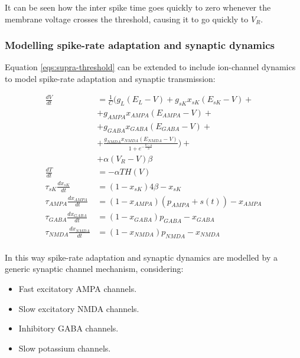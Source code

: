 		It can be seen how the inter spike time goes quickly to zero whenever the membrane voltage crosses the threshold, causing it to go quickly to $V_R$.

		\subsubsection{Modelling spike-rate adaptation and synaptic dynamics}
		Equation \ref{eqs:supra-threshold} can be extended to include ion-channel dynamics to model spike-rate adaptation and synaptic transmission:

		\begin{equation}
			\begin{aligned}
				\frac{dV}{dt} &= \frac{1}{C}\biggl(g_L(E_L-V)+g_{sK}x_{sK}(E_{sK}-V) +\\
				& +g_{\scriptscriptstyle{AMPA}}x_{\scriptscriptstyle{AMPA}}(E_{\scriptscriptstyle{AMPA}}-V) +\\
				& +g_{\scriptscriptstyle{GABA}}x_{\scriptscriptstyle{GABA}}(E_{\scriptscriptstyle{GABA}}-V) +\\
				& +\frac{g_{\scriptscriptstyle{NMDA}}x_{\scriptscriptstyle{NMDA}}(E_{\scriptscriptstyle{NMDA}}-V)}{1+e^{-\frac{V-a}{b}}}\biggr)+\\
				& + \alpha(V_R-V)\beta\\
				\frac{dT}{dt} &= -\alpha TH(V)\\
				\tau_{sK}\frac{dx_{sK}}{dt} &= (1-x_{sK})4\beta-x_{sK}\\
				\tau_{\scriptscriptstyle{AMPA}}\frac{dx_{\scriptscriptstyle{AMPA}}}{dt} &= (1-x_{\scriptscriptstyle{AMPA}})(p_{\scriptscriptstyle{AMPA}}+s(t))-x_{\scriptscriptstyle{AMPA}}\\
				\tau_{\scriptscriptstyle{GABA}}\frac{dx_{\scriptscriptstyle{GABA}}}{dt} &= (1-x_{\scriptscriptstyle{GABA}})p_{\scriptscriptstyle{GABA}}-x_{\scriptscriptstyle{GABA}}\\
				\tau_{\scriptscriptstyle{NMDA}}\frac{dx_{\scriptscriptstyle{NMDA}}}{dt} &= (1-x_{\scriptscriptstyle{NMDA}})p_{\scriptscriptstyle{NMDA}}-x_{\scriptscriptstyle{NMDA}}\\
				\label{eqs:synaptic-dynamics}
			\end{aligned}
		\end{equation}

		In this way spike-rate adaptation and synaptic dynamics are modelled by a generic synaptic channel mechanism, considering:

		\begin{itemize}
			\item Fast excitatory AMPA channels.
			\item Slow excitatory NMDA channels.
			\item Inhibitory GABA channels.
			\item Slow potassium channels.
		\end{itemize}

